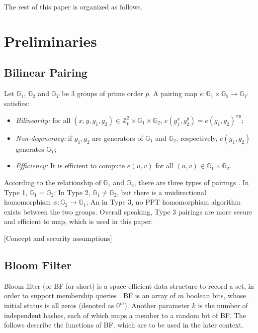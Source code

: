 \documentclass[conference]{IEEEtran}
\begin{document}
The rest of this paper is organized as follows. 


\section{Preliminaries}

\subsection{Bilinear Pairing}
Let $\mathbb{G}_1$, $\mathbb{G}_2$ and $\mathbb{G}_T$ be 3 groups of prime order $p$. A pairing map $e:\mathbb{G}_1\times \mathbb{G}_2\rightarrow\mathbb{G}_T$ satisfies:
\begin{itemize}
	\item \textit{Bilinearity:} for all $(x,y, g_1, g_2) \in \mathbb{Z}_p^2\times \mathbb{G}_1\times \mathbb{G}_2$, $e(g_1^x, g_2^y) = e(g_1, g_2)^{xy}$;
	\item \textit{Non-degeneracy:} if $g_1, g_2$ are generators of $\mathbb{G}_1$ and $\mathbb{G}_2$, respectively, $e(g_1, g_2)$ generates $\mathbb{G}_T$;
	\item \textit{Efficiency:} It is efficient to compute $e(u,v)$ for all $(u, v) \in \mathbb{G}_1\times \mathbb{G}_2$.
\end{itemize}

According to the relationship of $\mathbb{G}_1$ and $\mathbb{G}_2$, there are three types of pairings \cite{GALBRAITH20083113}. 
In Type 1, $\mathbb{G}_1 = \mathbb{G}_2$; In Type 2, $\mathbb{G}_1 \neq \mathbb{G}_2$, but there is a unidirectional homomorphism $\phi:\mathbb{G}_2 \rightarrow \mathbb{G}_1$; An in Type 3, no PPT homomorphism algorithm exists between the two groups.
Overall speaking, Type 3 pairings are more secure and efficient to map, which is used in this paper.

[Concept and security assumptions]

\subsection{Bloom Filter}
Bloom filter (or BF for short) is a space-efficient data structure to record a set, in order to support membership queries \cite{Bloom1970, broder2004network}.
BF is an array of $m$ boolean bits, whose initial status is all zeros (denoted as $0^m$). Another parameter $k$ is the number of independent hashes, each of which maps a member to a random bit of BF. The follows describe the functions of BF, which are to be used in the later context.
\end{document}
